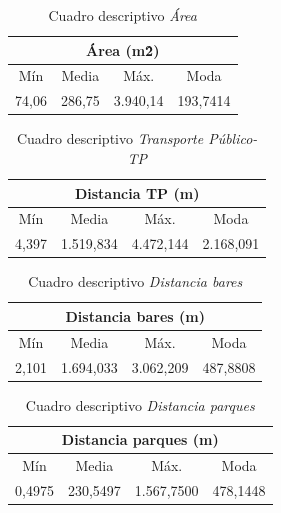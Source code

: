 \documentclass[conference, 10pt]{IEEEtran}
\begin{document}
\begin{table}[htbp]
\caption{Cuadro descriptivo \textit{Área}}
\begin{center}
\begin{tabular}{|c|c|c|c|}
\hline
\multicolumn{4}{|c|}{\textbf{Área (m\^{2})}} \\
\cline{1-4} 
\hline
 Mín&Media&Máx.&Moda\\
\hline
 74,06&286,75&3.940,14&193,7414\\
 	\hline
\end{tabular}
\label{tab_7}
\end{center}
\end{table}


\begin{table}[htbp]
\caption{Cuadro descriptivo \textit{Transporte Público-TP}}
\begin{center}
\begin{tabular}{|c|c|c|c|}
\hline
\multicolumn{4}{|c|}{\textbf{Distancia TP (m)}} \\
\cline{1-4} 
\hline
 Mín&Media&Máx.&Moda\\
\hline
 4,397&1.519,834&4.472,144&2.168,091\\
 	\hline
\end{tabular}
\label{tab_8}
\end{center}
\end{table}

\begin{table}[htbp]
\caption{Cuadro descriptivo \textit{Distancia bares}}
\begin{center}
\begin{tabular}{|c|c|c|c|}
\hline
\multicolumn{4}{|c|}{\textbf{Distancia bares (m)}} \\
\cline{1-4} 
\hline
 Mín&Media&Máx.&Moda\\
\hline
 2,101&1.694,033&3.062,209&487,8808\\
 	\hline
\end{tabular}
\label{tab_9}
\end{center}
\end{table}

\begin{table}[htbp]
\caption{Cuadro descriptivo \textit{Distancia parques}}
\begin{center}
\begin{tabular}{|c|c|c|c|}
\hline
\multicolumn{4}{|c|}{\textbf{Distancia parques (m)}} \\
\cline{1-4} 
\hline
 Mín&Media&Máx.&Moda\\
\hline
 0,4975&230,5497&1.567,7500&478,1448\\
 	\hline
\end{tabular}
\label{tab_10}
\end{center}
\end{table}
\end{document}
